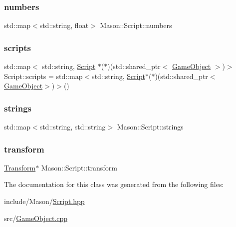 \subsubsection{\texorpdfstring{numbers}{numbers}}
{\footnotesize\ttfamily std\+::map$<$std\+::string, float$>$ Mason\+::\+Script\+::numbers}

\hypertarget{class_mason_1_1_script_a0b74a1b2b601b05841c95b44b329f859}{}\label{class_mason_1_1_script_a0b74a1b2b601b05841c95b44b329f859} 
\subsubsection{\texorpdfstring{scripts}{scripts}}
{\footnotesize\ttfamily std\+::map$<$ std\+::string, \hyperlink{class_mason_1_1_script}{Script} $\ast$($\ast$)(std\+::shared\+\_\+ptr$<$ \hyperlink{class_mason_1_1_game_object}{Game\+Object} $>$)$>$ Script\+::scripts = std\+::map$<$std\+::string, \hyperlink{class_mason_1_1_script}{Script}$\ast$($\ast$)(std\+::shared\+\_\+ptr$<$\hyperlink{class_mason_1_1_game_object}{Game\+Object}$>$)$>$()\hspace{0.3cm}{\ttfamily [static]}}

\hypertarget{class_mason_1_1_script_a96f691d0ccd8db2e3e95824e8579cc42}{}\label{class_mason_1_1_script_a96f691d0ccd8db2e3e95824e8579cc42} 
\subsubsection{\texorpdfstring{strings}{strings}}
{\footnotesize\ttfamily std\+::map$<$std\+::string, std\+::string$>$ Mason\+::\+Script\+::strings}

\hypertarget{class_mason_1_1_script_a4ac6ab2299555435468ba62c52ede167}{}\label{class_mason_1_1_script_a4ac6ab2299555435468ba62c52ede167} 
\subsubsection{\texorpdfstring{transform}{transform}}
{\footnotesize\ttfamily \hyperlink{class_mason_1_1_transform}{Transform}$\ast$ Mason\+::\+Script\+::transform}



The documentation for this class was generated from the following files\+:\begin{DoxyCompactItemize}
\item 
include/\+Mason/\hyperlink{_script_8hpp}{Script.\+hpp}\item 
src/\hyperlink{_game_object_8cpp}{Game\+Object.\+cpp}\end{DoxyCompactItemize}
